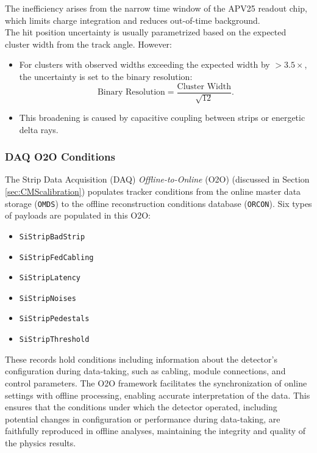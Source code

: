 The inefficiency arises from the narrow time window of the APV25 readout chip, which limits charge integration and reduces out-of-time background.\\

The hit position uncertainty is usually parametrized based on the expected cluster width from the track angle. However:
\begin{itemize}
    \item For clusters with observed widths exceeding the expected width by \(> 3.5\times\), the uncertainty is set to the binary resolution:
    \[
    \text{Binary Resolution} = \frac{\text{Cluster Width}}{\sqrt{12}}.
    \]
    \item This broadening is caused by capacitive coupling between strips or energetic delta rays.
\end{itemize}

\subsubsection{DAQ O2O Conditions}
The Strip Data Acquisition (DAQ) \emph{Offline-to-Online} (O2O) (discussed in Section \ref{sec:CMScalibration}) populates tracker conditions from the online master data storage (\texttt{OMDS}) to the offline reconstruction conditions database (\texttt{ORCON}). 
Six types of payloads are populated in this O2O: 
\begin{itemize}
\item \texttt{SiStripBadStrip} 	
\item \texttt{SiStripFedCabling} 	
\item \texttt{SiStripLatency} 	
\item \texttt{SiStripNoises} 	
\item \texttt{SiStripPedestals} 	
\item \texttt{SiStripThreshold}
\end{itemize}

These records hold conditions including information about the detector's configuration during data-taking, such as cabling, module connections, and control parameters. The O2O framework facilitates the synchronization of online settings with offline processing, enabling accurate interpretation of the data. This ensures that the conditions under which the detector operated, including potential changes in configuration or performance during data-taking, are faithfully reproduced in offline analyses, maintaining the integrity and quality of the physics results.

